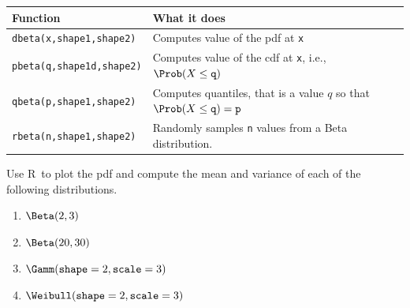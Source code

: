 \documentclass[twoside]{book}\usepackage[]{graphicx}\usepackage[]{xcolor}
\def\R{{\sf R}}
\begin{document}
\begin{center}
\begin{tabular}{ll}
	\hline
	Function & What it does \\
	\hline
	\texttt{dbeta(x,shape1,shape2)} & Computes value of the pdf at \texttt{x}
	\\
	\texttt{pbeta(q,shape1d,shape2)} 
		& Computes value of the cdf at \texttt{x}, i.e., 
	$\Prob(X \le \texttt{q})$
	\\
	\texttt{qbeta(p,shape1,shape2)} 
		& Computes quantiles, that is a value $q$ so that 
	$\Prob(X \le \texttt{q}) = \texttt{p}$
    \\
	\texttt{rbeta(n,shape1,shape2)} & Randomly samples \texttt{n} values from a
	Beta distribution.
	\\
	\hline
\end{tabular}
\end{center}

\begin{problem}
	Use \R\ to plot the pdf and 
	compute the mean and variance of each of the following distributions.
	\begin{enumerate}
		\item
			$\Beta(2,3)$
		\item
			$\Beta(20,30)$
		\item
			$\Gamm(\texttt{shape}=2,\texttt{scale}=3)$
		\item
			$\Weibull(\texttt{shape}=2,\texttt{scale}=3)$
	\end{enumerate}
\end{problem}
\end{document}
